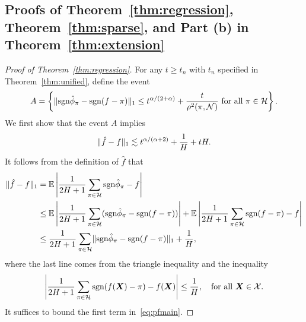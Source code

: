 \documentclass[11pt]{article}
\theoremstyle{plain}
\theoremstyle{definition}
\def\sign{\textup{sgn}}
\begin{document}
\subsection{Proofs of Theorem~\ref{thm:regression}, Theorem~\ref{thm:sparse}, and Part (b) in Theorem~\ref{thm:extension}}\label{sec:regression}
\begin{proof}[Proof of Theorem~\ref{thm:regression}]
For any  $t\geq t_n$ with $t_n$ specified in Theorem~\ref{thm:unified}, define the event
\[
A=\left\{\onenormSize{}{\sign \hat \phi_\pi- \sign (f-\pi)} \leq t^{\alpha/(2+\alpha)}+{t\over \rho^2(\pi,\tN)} \text{ for all }\pi\in\tH\right\}.
\]
We first show that the event $A$ implies
\begin{align}\label{eq:mb}
\lVert\hat f-f\rVert_1\lesssim t^{\alpha/(\alpha+2)}+{1\over H}+tH.
\end{align} 
It follows from the definition of $\hat f$ that
\begin{align}\label{eq:pfmain}
\onenormSize{}{\hat f-f}&=\mathbb{E}\left|{1\over 2H+1} \sum_{\pi\in \tH}\sign \hat \phi_\pi - f\right|\notag\\
&\leq \mathbb{E}\left|{1\over 2H+1}\sum_{\pi \in \tH} (\sign \hat \phi_\pi - \sign (f-\pi)) \right| +\mathbb{E}\left|{1\over 2H+1}\sum_{\pi \in \tH}\sign(f-\pi)-f\right|\notag\\
& \leq{1\over 2H+1}\sum_{\pi \in \tH}\onenormSize{}{\sign \hat \phi_\pi - \sign (f-\pi)}+{1\over H},
\end{align}
where the last line comes from the triangle inequality and the inequality
\[
\left|{1\over 2H+1}\sum_{\pi \in \tH}\sign(f(\mX)-\pi)-f(\mX)\right|\leq {1\over H}, \quad \text{for all } \mX\in\tX.
\]
It suffices to bound the first term in~\eqref{eq:pfmain}. 


\end{proof}
\end{document}
